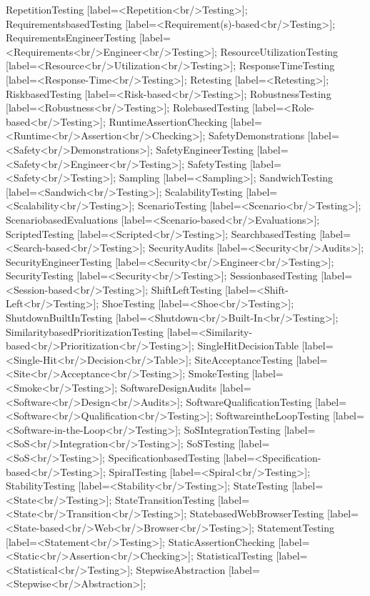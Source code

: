\documentclass{article}
\begin{document}
{RepetitionTesting [label=<Repetition<br/>Testing>];
RequirementsbasedTesting [label=<Requirement(s)-based<br/>Testing>];
RequirementsEngineerTesting [label=<Requirements<br/>Engineer<br/>Testing>];
ResourceUtilizationTesting [label=<Resource<br/>Utilization<br/>Testing>];
ResponseTimeTesting [label=<Response-Time<br/>Testing>];
Retesting [label=<Retesting>];
RiskbasedTesting [label=<Risk-based<br/>Testing>];
RobustnessTesting [label=<Robustness<br/>Testing>];
RolebasedTesting [label=<Role-based<br/>Testing>];
RuntimeAssertionChecking [label=<Runtime<br/>Assertion<br/>Checking>];
SafetyDemonstrations [label=<Safety<br/>Demonstrations>];
SafetyEngineerTesting [label=<Safety<br/>Engineer<br/>Testing>];
SafetyTesting [label=<Safety<br/>Testing>];
Sampling [label=<Sampling>];
SandwichTesting [label=<Sandwich<br/>Testing>];
ScalabilityTesting [label=<Scalability<br/>Testing>];
ScenarioTesting [label=<Scenario<br/>Testing>];
ScenariobasedEvaluations [label=<Scenario-based<br/>Evaluations>];
ScriptedTesting [label=<Scripted<br/>Testing>];
SearchbasedTesting [label=<Search-based<br/>Testing>];
SecurityAudits [label=<Security<br/>Audits>];
SecurityEngineerTesting [label=<Security<br/>Engineer<br/>Testing>];
SecurityTesting [label=<Security<br/>Testing>];
SessionbasedTesting [label=<Session-based<br/>Testing>];
ShiftLeftTesting [label=<Shift-Left<br/>Testing>];
ShoeTesting [label=<Shoe<br/>Testing>];
ShutdownBuiltInTesting [label=<Shutdown<br/>Built-In<br/>Testing>];
SimilaritybasedPrioritizationTesting [label=<Similarity-based<br/>Prioritization<br/>Testing>];
SingleHitDecisionTable [label=<Single-Hit<br/>Decision<br/>Table>];
SiteAcceptanceTesting [label=<Site<br/>Acceptance<br/>Testing>];
SmokeTesting [label=<Smoke<br/>Testing>];
SoftwareDesignAudits [label=<Software<br/>Design<br/>Audits>];
SoftwareQualificationTesting [label=<Software<br/>Qualification<br/>Testing>];
SoftwareintheLoopTesting [label=<Software-in-the-Loop<br/>Testing>];
SoSIntegrationTesting [label=<SoS<br/>Integration<br/>Testing>];
SoSTesting [label=<SoS<br/>Testing>];
SpecificationbasedTesting [label=<Specification-based<br/>Testing>];
SpiralTesting [label=<Spiral<br/>Testing>];
StabilityTesting [label=<Stability<br/>Testing>];
StateTesting [label=<State<br/>Testing>];
StateTransitionTesting [label=<State<br/>Transition<br/>Testing>];
StatebasedWebBrowserTesting [label=<State-based<br/>Web<br/>Browser<br/>Testing>];
StatementTesting [label=<Statement<br/>Testing>];
StaticAssertionChecking [label=<Static<br/>Assertion<br/>Checking>];
StatisticalTesting [label=<Statistical<br/>Testing>];
StepwiseAbstraction [label=<Stepwise<br/>Abstraction>];
}
\end{document}
